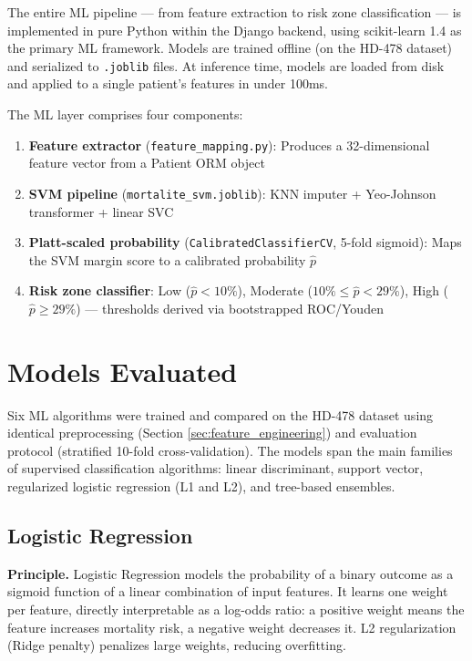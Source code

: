 \documentclass[12pt,a4paper,twoside]{report}
\begin{document}
The entire ML pipeline — from feature extraction to risk zone classification — is implemented in pure Python within the Django backend, using scikit-learn 1.4 as the primary ML framework. Models are trained offline (on the HD-478 dataset) and serialized to \texttt{.joblib} files. At inference time, models are loaded from disk and applied to a single patient's features in under 100ms.

The ML layer comprises four components:
\begin{enumerate}
  \item \textbf{Feature extractor} (\texttt{feature\_mapping.py}): Produces a 32-dimensional feature vector from a Patient ORM object
  \item \textbf{SVM pipeline} (\texttt{mortalite\_svm.joblib}): KNN imputer + Yeo-Johnson transformer + linear SVC
  \item \textbf{Platt-scaled probability} (\texttt{CalibratedClassifierCV}, 5-fold sigmoid): Maps the SVM margin score to a calibrated probability $\hat{p}$
  \item \textbf{Risk zone classifier}: Low ($\hat{p}<10\%$), Moderate ($10\%\leq\hat{p}<29\%$), High ($\hat{p}\geq29\%$) — thresholds derived via bootstrapped ROC/Youden
\end{enumerate}

\section{Models Evaluated}\label{sec:models}

Six ML algorithms were trained and compared on the HD-478 dataset using identical preprocessing (Section \ref{sec:feature_engineering}) and evaluation protocol (stratified 10-fold cross-validation). The models span the main families of supervised classification algorithms: linear discriminant, support vector, regularized logistic regression (L1 and L2), and tree-based ensembles.

\subsection{Logistic Regression}

\textbf{Principle.} Logistic Regression models the probability of a binary outcome as a sigmoid function of a linear combination of input features. It learns one weight per feature, directly interpretable as a log-odds ratio: a positive weight means the feature increases mortality risk, a negative weight decreases it. L2 regularization (Ridge penalty) penalizes large weights, reducing overfitting.
\end{document}
